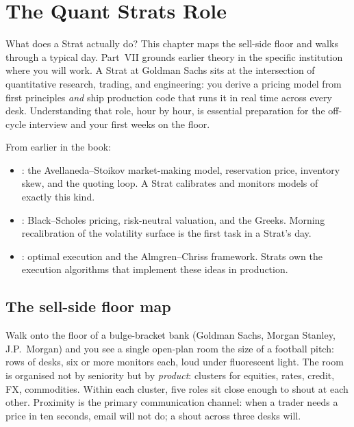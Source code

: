 \chapter{The Quant Strats Role}
\label{ch:strats_role}

What does a Strat actually do?  This chapter maps the sell-side
floor and walks through a typical day.  Part~VII grounds earlier
theory in the specific institution where you will work.  A Strat at
Goldman Sachs sits at the intersection of quantitative research,
trading, and engineering: you derive a pricing model from first
principles \emph{and} ship production code that runs it in real time
across every desk.  Understanding that role, hour by hour, is
essential preparation for the off-cycle interview and your first
weeks on the floor.

\begin{backgroundbox}[Prerequisites]
From earlier in the book:
\begin{itemize}
  \item {}: the Avellaneda--Stoikov
    market-making model, reservation price, inventory skew, and the
    quoting loop.  A Strat calibrates and monitors models of exactly
    this kind.
  \item {}: Black--Scholes pricing, risk-neutral
    valuation, and the Greeks.  Morning recalibration of the
    volatility surface is the first task in a Strat's day.
  \item {}: optimal execution and the
    Almgren--Chriss framework.  Strats own the execution algorithms
    that implement these ideas in production.
\end{itemize}
\end{backgroundbox}

\section{The sell-side floor map}
\label{sec:strats_floor_map}

Walk onto the floor of a bulge-bracket bank (Goldman Sachs, Morgan
Stanley, J.P.~Morgan) and you see a single open-plan room the size
of a football pitch: rows of desks, six or more monitors each, loud
under fluorescent light.  The room is organised not by seniority but
by \emph{product}: clusters for equities, rates, credit, FX,
commodities.  Within each cluster, five roles sit close enough to
shout at each other.  Proximity is the primary communication
channel: when a trader needs a price in ten seconds, email will not
do; a shout across three desks will.

